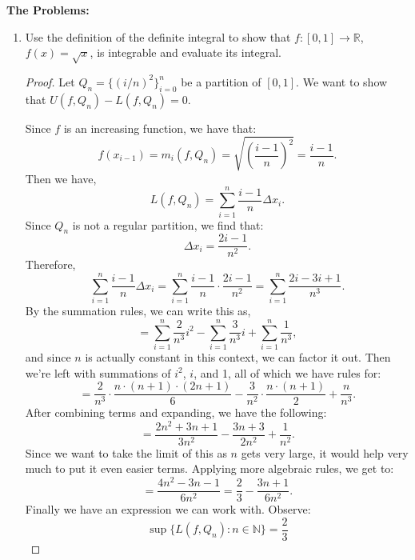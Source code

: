 \documentclass[12pt]{amsart}
\begin{document}


\vspace{0.3cm}


{\bf The Problems:}
\begin{enumerate}

\setlength{\itemsep}{8pt}
\setlength{\parindent}{0pt}
\setlength{\parskip}{4pt}

\item  Use the definition of the definite integral to show that $f : [0,1] \rightarrow \mathbb{R}$, $f(x)=\sqrt{x}$, is integrable and evaluate its integral.   
%

\begin{proof}
Let $Q_n= \{ (i/n)^2\}_{i=0}^n$ be a partition of $[0,1]$. We want to show that $U(f,Q_n) - L(f,Q_n)=0$.

Since $f$ is an increasing function, we have that:
%
\[ f(x_{i-1}) = m_i(f,Q_n) = \sqrt{\left(\frac{i-1}{n}\right)^2} = \frac{i-1}{n}. \]
%
Then we have,
%
\[ L(f,Q_n) = \sum_{i=1}^n \frac{i-1}{n} \Delta x_i. \]
%
Since $Q_n$ is not a regular partition, we find that:
%
\[ \Delta x_i = \frac{2i-1}{n^2}. \]
%
Therefore,
%
\[ \sum_{i=1}^n \frac{i-1}{n} \Delta x_i = \sum_{i=1}^n \frac{i-1}{n} \cdot\frac{2i-1}{n^2} = \sum_{i=1}^n \frac{2i-3i+1}{n^3}. \]
%
By the summation rules, we can write this as,
%
\[ = \sum_{i=1}^n \frac{2}{n^3} i^2 - \sum_{i=1}^n \frac {3}{n^3} i +  \sum_{i=1}^n \frac 1 {n^3}, \]
%
and since $n$ is actually constant in this context, we can factor it out. Then we're left with summations of $i^2$, $i$, and 1, all of which we have rules for:
%
\[ = \frac 2 {n^3} \cdot \frac {n\cdot(n+1)\cdot(2n+1)}{6} - \frac 3 {n^2} \cdot \frac{n\cdot(n+1)} 2 + \frac n {n^3}. \]
%
After combining terms and expanding, we have the following:
%
\[ = \frac{2n^2 + 3n +1}{3n^2} - \frac{3n+3}{2n^2} + \frac 1 {n^2}. \]
%
Since we want to take the limit of this as $n$ gets very large, it would help very much to put it even easier terms. Applying more algebraic rules, we get to:
%
\[ = \frac {4n^2 - 3n -1}{6n^2} = \frac 2 3 - \frac{3n+1}{6n^2}. \]
%
Finally we have an expression we can work with. Observe:
%
\[ \sup\{ L(f, Q_n) : n\in\mathbb N \} = \frac 2 3 \]
%


\end{proof}
\end{enumerate}
\end{document}
